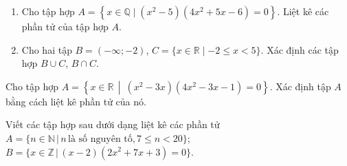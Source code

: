 \begin{bt}%
	\begin{enumerate}
		\item Cho tập hợp $A=\left\{x \in \mathbb{Q} \mid\left(x^2-5\right)\left(4x^2+5x-6\right)=0\right\}$. Liệt kê các phần tử của tập hợp $A$.
		\item Cho hai tập $B=(-\infty;-2)$, $C=\{x \in \mathbb{R} \mid-2 \leq x<5\}$. Xác định các tập hợp $B \cup C$, $B \cap C$.	
	\end{enumerate}
	\loigiai{
		\begin{enumerate}
			\item Ta có
			$$\left(x^2-5\right)\left(4x^2+5x-6\right)=0 \Leftrightarrow \hoac{&x^2-5=0 \\& 4x^2+5x-6=0} \Leftrightarrow \hoac{& x=\pm \sqrt{5} \\& x=\dfrac{3}{4}\\& x=-2.}$$
			Vì $x \in \mathbb{Q}$ nên $A=\left\{-2;\dfrac{3}{4}\right\}$.
			\item Ta có $C=\left[-2;5\right)$. Khi đó
			\begin{itemize}
				\item $B \cup C=(-\infty;-2) \cup \left[-2;5\right)=(-\infty;5)$.
				\item $B \cap C=(-\infty;-2) \cap \left[-2;5\right)=\varnothing$.
			\end{itemize}			
		\end{enumerate}
}
\end{bt}

\begin{bt}%
	Cho tập hợp $A=\left\{x\in\mathbb{R}\,\middle|\ (x^2-3x)(4x^2-3x-1)=0\right\}$. Xác định tập $A$ bằng cách liệt kê phần tử của nó.
\end{bt}

\begin{bt}%
  	Viết các tập hợp sau dưới dạng liệt kê các phần tử $ A=\{n\in\mathbb{N}\,|\,n\,\text{là số nguyên tố},7\leq n<20\} $;
		 $ B=\{x\in\mathbb{Z}\,|\,(x-2)(2x^2+7x+3)=0\} $.
 
\end{bt}

